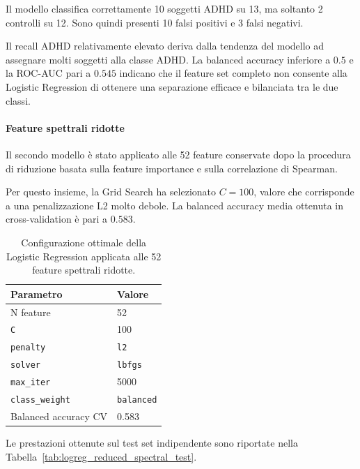 Il modello classifica correttamente 10 soggetti ADHD su 13, ma
soltanto 2 controlli su 12. Sono quindi presenti 10 falsi positivi
e 3 falsi negativi.

Il recall ADHD relativamente elevato deriva dalla tendenza del
modello ad assegnare molti soggetti alla classe ADHD. La balanced
accuracy inferiore a $0.5$ e la ROC-AUC pari a $0.545$ indicano che
il feature set completo non consente alla Logistic Regression di
ottenere una separazione efficace e bilanciata tra le due classi.


\paragraph{Feature spettrali ridotte}

Il secondo modello è stato applicato alle 52 feature conservate dopo
la procedura di riduzione basata sulla feature importance e sulla
correlazione di Spearman.

Per questo insieme, la Grid Search ha selezionato $C=100$, valore che
corrisponde a una penalizzazione L2 molto debole. La balanced accuracy
media ottenuta in cross-validation è pari a $0.583$.

\begin{table}[H]
	\centering
	\begin{tabular}{ll}
		\hline
		\textbf{Parametro} & \textbf{Valore} \\
		\hline
		N feature & 52 \\
		\texttt{C} & 100 \\
		\texttt{penalty} & \texttt{l2} \\
		\texttt{solver} & \texttt{lbfgs} \\
		\texttt{max\_iter} & 5000 \\
		\texttt{class\_weight} & \texttt{balanced} \\
		Balanced accuracy CV & 0.583 \\
		\hline
	\end{tabular}
	\caption{Configurazione ottimale della Logistic Regression
		applicata alle 52 feature spettrali ridotte.}
	\label{tab:logreg_reduced_spectral_hyperparameters}
\end{table}

Le prestazioni ottenute sul test set indipendente sono riportate
nella Tabella~\ref{tab:logreg_reduced_spectral_test}.


